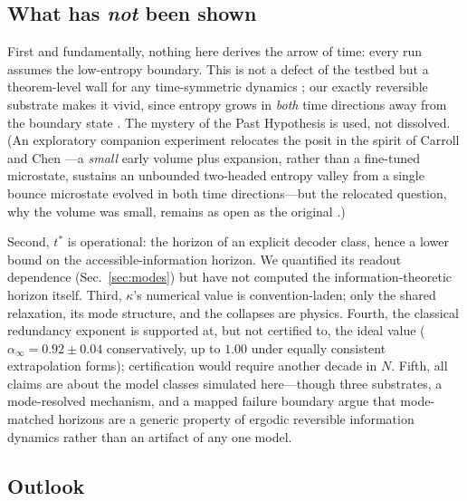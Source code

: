 \documentclass[aps,pre,twocolumn,superscriptaddress,nofootinbib,longbibliography]{revtex4-2}
\newcommand{\tstar}{t^{*}}
\newcommand{\kap}{\kappa}
\begin{document}
\subsection{What has \emph{not} been shown}

First and fundamentally, nothing here derives the arrow of time: every run assumes the
low-entropy boundary. This is not a defect of the testbed but a theorem-level wall for any
time-symmetric dynamics \cite{loschmidt1876,price1996}; our exactly reversible substrate
makes it vivid, since entropy grows in \emph{both} time directions away from the boundary
state \cite{repo}. The mystery of the Past Hypothesis is used, not dissolved. (An
exploratory companion experiment relocates the posit in the spirit of Carroll and Chen
\cite{carrollchen2004}---a \emph{small} early volume plus expansion, rather than a
fine-tuned microstate, sustains an unbounded two-headed entropy valley from a single bounce
microstate evolved in both time directions---but the relocated question, why the volume was
small, remains as open as the original \cite{repo}.)

Second, $\tstar$ is operational: the horizon of an explicit decoder class, hence a lower
bound on the accessible-information horizon. We quantified its readout dependence
(Sec.~\ref{sec:modes}) but have not computed the information-theoretic horizon itself.
Third, $\kap$'s numerical value is convention-laden; only the shared relaxation, its mode
structure, and the collapses are physics. Fourth, the classical redundancy exponent is
supported at, but not certified to, the ideal value ($\alpha_\infty=0.92\pm0.04$
conservatively, up to $1.00$ under equally consistent extrapolation forms); certification
would require another decade in $N$. Fifth, all claims are about the model classes
simulated here---though three substrates, a mode-resolved mechanism, and a mapped failure
boundary argue that mode-matched horizons are a generic property of ergodic reversible
information dynamics rather than an artifact of any one model.

\subsection{Outlook}
\end{document}
